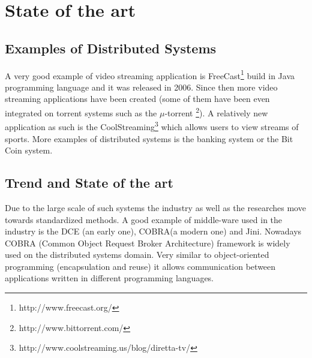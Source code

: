 \section{State of the art}
\label{sota}

\subsection{Examples of Distributed Systems}

A very good example of video streaming application is FreeCast\footnote{http://www.freecast.org/} build in Java programming language and it was released in 2006. Since then more video streaming applications have been created (some of them have been even integrated on torrent systems such as the $\mu$-torrent \footnote{http://www.bittorrent.com/}). A relatively new application as such is the CoolStreaming\footnote{http://www.coolstreaming.us/blog/diretta-tv/} which allows users to view streams of sports. More examples of distributed systems is the banking system or the Bit Coin system. \\


\subsection{Trend and State of the art}

Due to the large scale of such systems the industry as well as the researches move towards standardized methods. A good example of middle-ware used in the industry is the DCE (an early one), COBRA(a modern one) and Jini. Nowadays COBRA (Common Object Request Broker Architecture) framework is widely used on the distributed systems domain. Very similar to object-oriented programming (encapsulation and reuse) it allows communication between applications written in different programming languages. \\